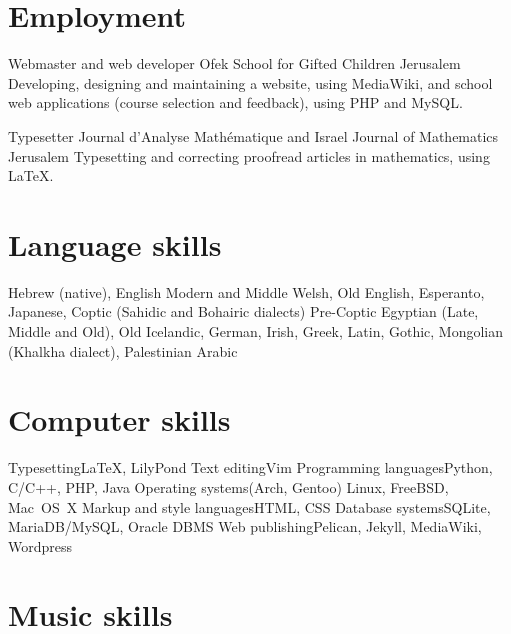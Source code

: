 \section{Employment}

	{Webmaster and web developer}
	{Ofek School for Gifted Children}
	{Jerusalem}
	{}
	{Developing, designing and maintaining a website, using MediaWiki, and school web applications (course selection and feedback), using PHP and MySQL.}

	{Typesetter}
	{Journal d’Analyse Mathématique and Israel Journal of Mathematics}
	{Jerusalem}
	{}
	{Typesetting and correcting proofread articles in mathematics, using \LaTeX .}



\section{Language skills}

	{Hebrew (native), English}
	{Modern and Middle Welsh, Old English, Esperanto, Japanese, Coptic (Sahidic and Bohairic dialects)}
	{Pre-Coptic Egyptian (Late, Middle and Old), Old Icelandic, German, Irish, Greek, Latin, Gothic, Mongolian (Khalkha dialect), Palestinian Arabic}



\section{Computer skills}

\cvdoubleitem
	{Typesetting}{{\texfont\LaTeX}, LilyPond}
	{Text editing}{Vim}
\cvdoubleitem
	{Programming languages}{Python, C/C++, PHP, Java}
	{Operating systems}{(Arch, Gentoo) Linux, FreeBSD, Mac~OS~X}
\cvdoubleitem
	{Markup and style languages}{HTML, CSS}
	{Database systems}{SQLite, MariaDB/MySQL, Oracle DBMS}
\cvdoubleitem
	{Web publishing}{Pelican, Jekyll, MediaWiki, Wordpress}
	{}{}



\section{Music skills}



